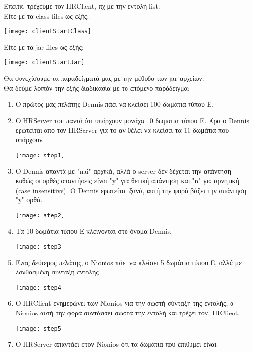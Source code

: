 Έπειτα. τρέχουμε τον HRClient, πχ με την εντολή list:
\\
Είτε με τα class files ως εξής:
\begin{center}
    \texttt{[image: clientStartClass]}
\end{center}
Είτε με τα jar files ως εξής:
\begin{center}
    \texttt{[image: clientStartJar]}
\end{center}
Θα συνεχίσουμε τα παραδείγματά μας με την μέθοδο των jar αρχείων.
\\
Θα δούμε λοιπόν την εξής διαδικασία με το επόμενο παράδειγμα:
\begin{enumerate}
\item Ο πρώτος μας πελάτης Dennis πάει να κλείσει 100 δωμάτια τύπου Ε.
\item Ο HRServer του παντά ότι υπάρχουν μονάχα 10 δωμάτια τύπου Ε.
    Άρα ο Dennis ερωτείται από τον HRServer για το αν θέλει να κλείσει τα 10
    δωμάτια που υπάρχουν.
\begin{center}
    \texttt{[image: step1]}
\end{center}
\item Ο Dennis απαντά με "nai" αρχικά, αλλά ο server δεν δέχεται την απάντηση,
    καθώς οι ορθές απαντήσεις είναι "y" για θετική απάντηση και "n" για
    αρνητική (case insensitive).
    Ο Dennis ερωτείται ξανά, αυτή την φορά βάζει την απάντηση "y" ορθά.
\begin{center}
    \texttt{[image: step2]}
\end{center}
\item Τα 10 δωμάτια τύπου Ε κλείνονται στο όνομα Dennis.
\begin{center}
    \texttt{[image: step3]}
\end{center}
\item Ένας δεύτερος πελάτης, ο Nionios πάει να κλείσει 5 δωμάτια τύπου Ε, αλλά
    με λανθασμένη σύνταξη εντολής.
\begin{center}
    \texttt{[image: step4]}
\end{center}
\item Ο HRClient ενημερώνει των Nionios για την σωστή σύνταξη της εντολής, ο
    Nionios αυτή την φορά συντάσσει σωστά την εντολή και τρέχει τον HRClient.
\begin{center}
    \texttt{[image: step5]}
\end{center}
\item Ο HRServer απαντάει στον Nionios ότι τα δωμάτια που επιθυμεί είναι

\end{enumerate}
